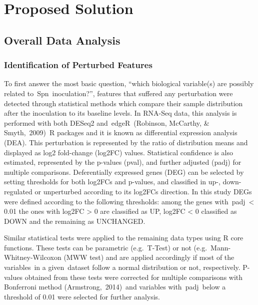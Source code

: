 \documentclass[
]{book}
\begin{document}
\hypertarget{proposed-solution}{%
\section{Proposed Solution}\label{proposed-solution}}

\hypertarget{overall-data-analysis}{%
\subsection{Overall Data Analysis}\label{overall-data-analysis}}

\hypertarget{identification-of-perturbed-features}{%
\subsubsection{Identification of Perturbed Features}\label{identification-of-perturbed-features}}

To first answer the most basic question, ``which biological variable(s) are possibly related to~Spn~inoculation?'', features that suffered any perturbation were detected through statistical methods which compare their sample distribution after the inoculation to its baseline levels. In RNA-Seq data, this analysis is performed with both DESeq2 and~edgeR~(Robinson, McCarthy, \& Smyth,~2009)⁠~R packages and it is known as differential expression analysis (DEA). This perturbation is represented by the ratio of distribution means and displayed as log2 fold-change (log2FC) values. Statistical confidence is also estimated, represented by the p-values (pval), and further adjusted (padj) for multiple comparisons. Deferentially expressed genes (DEG) can be selected by setting thresholds for both log2FCs and p-values, and classified in up-, down-regulated or unperturbed according to its log2FCs direction. In this study DEGs were defined according to the following thresholds: among the genes with~padj~\textless{} 0.01 the ones with log2FC \textgreater{} 0 are classified as UP, log2FC \textless{} 0 classified as DOWN and the remaining as UNCHANGED.

Similar statistical tests were applied to the remaining data types using R core functions. These tests can be parametric (e.g.~T-Test) or not (e.g.~Mann-Whitney-Wilcoxon (MWW test) and are applied accordingly if most of the variables~in a given~dataset follow a normal distribution or not, respectively. P-values obtained from these tests were corrected for multiple comparisons with Bonferroni method (Armstrong,~2014)⁠~and variables with~padj~below a threshold of 0.01 were selected for further analysis.
\end{document}
